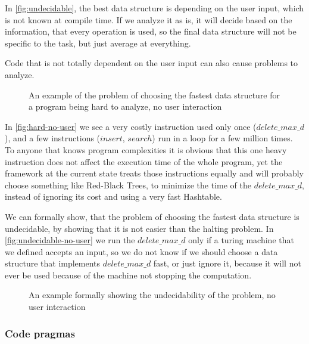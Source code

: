 \documentclass[a4paper,11pt]{article}
\begin{document}
		In \autoref{fig:undecidable}, the best data structure is depending on the user input, which is not known at
		compile time. If we analyze it as is, it will decide based on the information, that every operation is
		used, so the final data structure will not be specific to the task, but just average at everything.

		Code that is not totally dependent on the user input can also cause problems to analyze.

        \begin{figure}[!h]
			

			\caption{An example of the problem of choosing the fastest data structure for a program being hard to
            analyze, no user interaction}

			\label{fig:hard-no-user}
		\end{figure}

		In \autoref{fig:hard-no-user} we see a very costly instruction used only once
		($delete\_max\_d$), and a few instructions ($insert$, $search$) run in a loop for a few million times.
		To anyone that knows program complexities it is obvious that this one heavy instruction does not affect
		the execution time of the whole program, yet the framework at the current state treats those
		instructions equally and will probably choose something like Red-Black Trees, to minimize the time of
		the $delete\_max\_d$, instead of ignoring its cost and using a very fast Hashtable.

        We can formally show, that the problem of choosing the fastest data structure is undecidable, by showing that
        it is not easier than the halting problem. In \autoref{fig:undecidable-no-user} we run the $delete\_max\_d$ only
        if a turing machine that we defined accepts an input, so we do not know if we should choose a data structure that
        implements $delete\_max\_d$ fast, or just ignore it, because it will not ever be used because of the machine not
        stopping the computation.

        \begin{figure}
			

			\caption{An example formally showing the undecidability of the problem, no user interaction}

			\label{fig:undecidable-no-user}
		\end{figure}

		\subsubsection{Code pragmas} \label{sec:pragmas}
\end{document}
